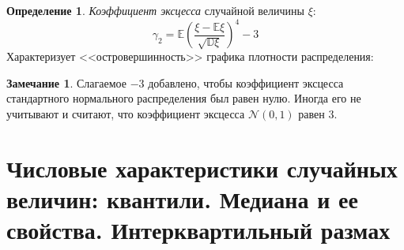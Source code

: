 \documentclass[oneside,final,14pt]{extreport}
\theoremstyle{plain}
\theoremstyle{definition}
\newtheorem*{defn}{Определение}
\newtheorem*{rmrk}{Замечание}
\theoremstyle{named}
\begin{document}
\begin{defn}
    {\it Коэффициент эксцесса} случайной величины $\xi$:
    \begin{equation*}
        \gamma_2=\mathbb{E}\left(\frac{\xi - \mathbb{E}\xi}{\sqrt{\mathbb{D}\xi}}\right)^4 - 3
    \end{equation*}
    Характеризует <<островершинность>> графика плотности распределения:
    \medskip\hfill\break
    \begin{center}
    \end{center}
\end{defn}

\begin{rmrk}
    Слагаемое $-3$ добавлено, чтобы коэффициент эксцесса стандартного нормального распределения был равен нулю. Иногда его не учитывают и считают, что коэффициент эксцесса $\mathcal{N}(0,1)$ равен 3.
\end{rmrk}

\section {Числовые характеристики случайных величин: квантили. Медиана и ее свойства. Интерквартильный размах}
\end{document}
